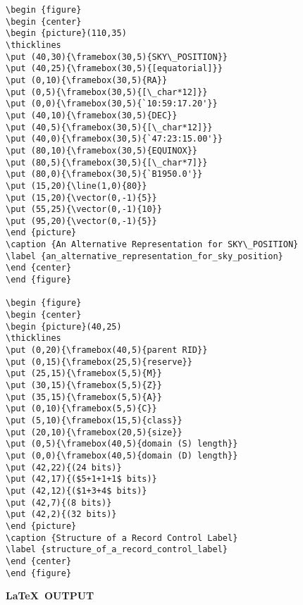 \begin{verbatim}
\begin {figure}
\begin {center}
\begin {picture}(110,35)
\thicklines
\put (40,30){\framebox(30,5){SKY\_POSITION}}
\put (40,25){\framebox(30,5){[equatorial]}}
\put (0,10){\framebox(30,5){RA}}
\put (0,5){\framebox(30,5){[\_char*12]}}
\put (0,0){\framebox(30,5){`10:59:17.20'}}
\put (40,10){\framebox(30,5){DEC}}
\put (40,5){\framebox(30,5){[\_char*12]}}
\put (40,0){\framebox(30,5){`47:23:15.00'}}
\put (80,10){\framebox(30,5){EQUINOX}}
\put (80,5){\framebox(30,5){[\_char*7]}}
\put (80,0){\framebox(30,5){`B1950.0'}}
\put (15,20){\line(1,0){80}}
\put (15,20){\vector(0,-1){5}}
\put (55,25){\vector(0,-1){10}}
\put (95,20){\vector(0,-1){5}}
\end {picture}
\caption {An Alternative Representation for SKY\_POSITION}
\label {an_alternative_representation_for_sky_position}
\end {center}
\end {figure}

\begin {figure}
\begin {center}
\begin {picture}(40,25)
\thicklines
\put (0,20){\framebox(40,5){parent RID}}
\put (0,15){\framebox(25,5){reserve}}
\put (25,15){\framebox(5,5){M}}
\put (30,15){\framebox(5,5){Z}}
\put (35,15){\framebox(5,5){A}}
\put (0,10){\framebox(5,5){C}}
\put (5,10){\framebox(15,5){class}}
\put (20,10){\framebox(20,5){size}}
\put (0,5){\framebox(40,5){domain (S) length}}
\put (0,0){\framebox(40,5){domain (D) length}}
\put (42,22){(24 bits)}
\put (42,17){($5+1+1+1$ bits)}
\put (42,12){($1+3+4$ bits)}
\put (42,7){(8 bits)}
\put (42,2){(32 bits)}
\end {picture}
\caption {Structure of a Record Control Label}
\label {structure_of_a_record_control_label}
\end {center}
\end {figure}
\end{verbatim}

\newpage

\begin{center}
{\bf \LaTeX\ OUTPUT}
\end{center}

